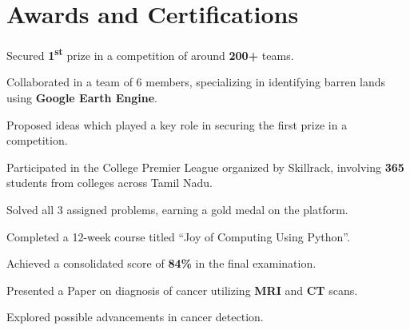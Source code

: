 \documentclass[]{deedy-resume-openfont}
\begin{document}
\begin{minipage}[t]{0.66\textwidth}
    \section{Awards and Certifications}


    \begin{tightemize}
        \item Secured \textbf{1\textsuperscript{st}} prize in a competition of around \textbf{200+} teams.
        \item Collaborated in a team of 6 members, specializing in identifying barren lands using \textbf{Google Earth Engine}.
        \item Proposed ideas which played a key role in securing the first prize in a competition.
    \end{tightemize}
    \sectionsep


    \begin{tightemize}
        \item Participated in the College Premier League organized by Skillrack, involving \textbf{365} students from colleges across Tamil Nadu.
        \item Solved all 3 assigned problems, earning a gold medal on the platform.
    \end{tightemize}
    \sectionsep


    \begin{tightemize}
        \item Completed a 12-week course titled ``Joy of Computing Using Python''.
        \item Achieved a consolidated score of \textbf{84\%} in the final examination.
    \end{tightemize}
    \sectionsep


    \begin{tightemize}
        \item Presented a Paper on diagnosis of cancer utilizing {\textbf{MRI} and \textbf{CT} scans}.
        \item Explored possible advancements in cancer detection.
    \end{tightemize}
    \sectionsep




\end{minipage}
\end{document}
